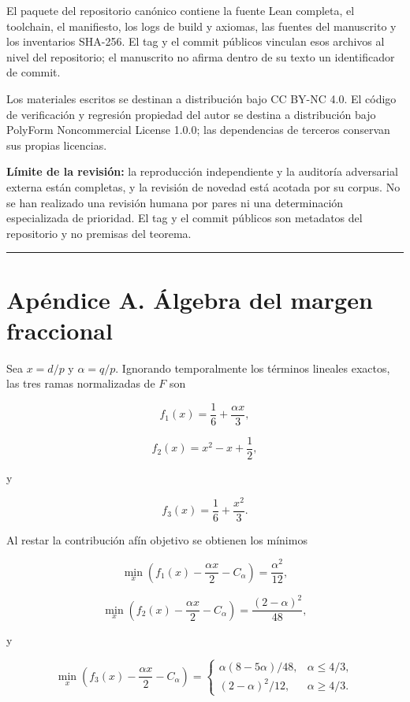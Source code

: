 \documentclass[
  spanish,
  11pt,
  a4paper,
]{article}
\begin{document}
El paquete del repositorio canónico contiene la fuente Lean completa, el toolchain, el manifiesto, los logs de build y axiomas, las fuentes del manuscrito y los inventarios SHA-256. El tag y el commit públicos vinculan esos archivos al nivel del repositorio; el manuscrito no afirma dentro de su texto un identificador de commit.

Los materiales escritos se destinan a distribución bajo CC BY-NC 4.0. El código de verificación y regresión propiedad del autor se destina a distribución bajo PolyForm Noncommercial License 1.0.0; las dependencias de terceros conservan sus propias licencias.

\textbf{Límite de la revisión:} la reproducción independiente y la auditoría adversarial externa están completas, y la revisión de novedad está acotada por su corpus. No se han realizado una revisión humana por pares ni una determinación especializada de prioridad. El tag y el commit públicos son metadatos del repositorio y no premisas del teorema.

\begin{center}\rule{0.5\linewidth}{0.5pt}\end{center}

\section{Apéndice A. Álgebra del margen fraccional}\label{apuxe9ndice-a.-uxe1lgebra-del-margen-fraccional}

Sea \(x=d/p\) y \(\alpha=q/p\). Ignorando temporalmente los términos lineales exactos, las tres ramas normalizadas de \(F\) son

\[
f_1(x)=\frac16+\frac{\alpha x}{3},
\]

\[
f_2(x)=x^2-x+\frac12,
\]

y

\[
f_3(x)=\frac16+\frac{x^2}{3}.
\]

Al restar la contribución afín objetivo se obtienen los mínimos

\[
\min_x\left(f_1(x)-\frac{\alpha x}{2}-C_\alpha\right)
=
\frac{\alpha^2}{12},
\]

\[
\min_x\left(f_2(x)-\frac{\alpha x}{2}-C_\alpha\right)
=
\frac{(2-\alpha)^2}{48},
\]

y

\[
\min_x\left(f_3(x)-\frac{\alpha x}{2}-C_\alpha\right)
=
\begin{cases}
\alpha(8-5\alpha)/48,&\alpha\le4/3,\\
(2-\alpha)^2/12,&\alpha\ge4/3.
\end{cases}
\]
\end{document}

